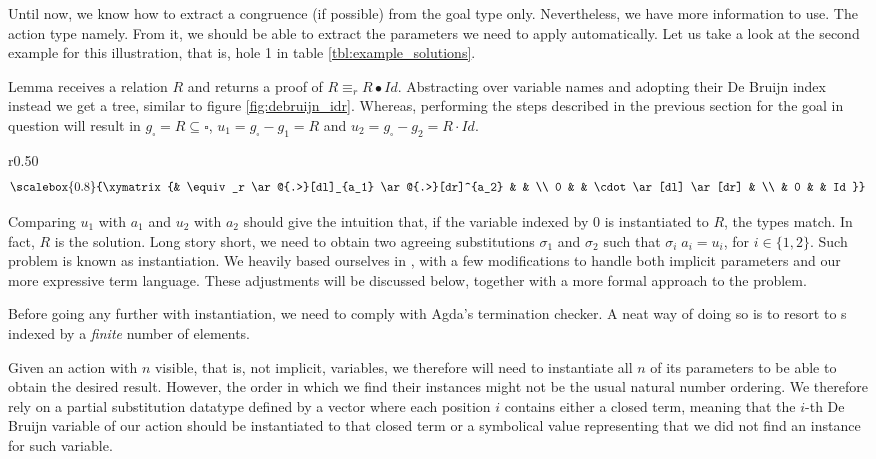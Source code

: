 Until now, we know how to extract a congruence (if possible) from the goal type only. Nevertheless,
we have more information to use. The action type namely. From it, we should be able to extract
the parameters we need to apply automatically. Let us take a look at the second example
for this illustration, that is, hole 1 in table \ref{tbl:example_solutions}.

Lemma  receives a relation $R$ and returns a proof of $R \equiv_r R ∙ Id$. Abstracting
over variable names and adopting their De Bruijn index instead we get a tree, similar to figure \ref{fig:debruijn_idr}. Whereas, performing the steps described in the previous section
for the goal in question will result in $g_\square = R \subseteq \square$, $u_1 = g_\square - g_1 = R$
and $u_2 = g_\square - g_2 = R \cdot Id$.

\begin{wrapfigure}{r}{0.50\textwidth}
\begin{displaymath}
\scalebox{0.8}{%
\xymatrix{%
 & \equiv_r \ar@{.>}[dl]_{a_1} \ar@{.>}[dr]^{a_2} & & \\
0 & & \cdot \ar[dl] \ar[dr] & \\
& 0 & & Id
}}
\end{displaymath}
\caption{'s type}
\label{fig:debruijn_idr}
\end{wrapfigure}

Comparing $u_1$ with $a_1$ and $u_2$ with $a_2$ should give the intuition that, if the
variable indexed by $0$ is instantiated to $R$, the types match. In fact, $R$ is the solution.
Long story short, we need to obtain two agreeing substitutions $\sigma_1$ and $\sigma_2$ such
that $\sigma_i\;a_i = u_i$, for $i\in\{1 , 2\}$. Such problem is known as instantiation.
We heavily based ourselves in \cite{wouter13}, with a few modifications to handle both implicit
parameters and our more expressive term language. These adjustments will be discussed below,
together with a more formal approach to the problem.

Before going any further with instantiation, we need to comply with Agda's termination checker.
A neat way of doing so is to resort to s indexed by a \emph{finite} number of elements.


Given an action with $n$ visible, that is, not implicit, variables, we therefore will need to instantiate all $n$ of its parameters to be able to
obtain the desired result. However, the order in which we find their instances
might not be the usual natural number ordering. We therefore rely on a
partial substitution datatype defined by a vector where each position $i$ contains
either a closed term, meaning that the $i$-th De Bruijn variable of our action should be instantiated to that closed term or a symbolical value representing that we did not find an instance for such variable.

